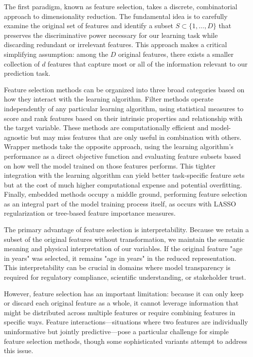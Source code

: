 The first paradigm, known as feature selection, takes a discrete, combinatorial approach to dimensionality reduction. The fundamental idea is to carefully examine the original set of features and identify a subset $S \subset \{1, \ldots, D\}$ that preserves the discriminative power necessary for our learning task while discarding redundant or irrelevant features. This approach makes a critical simplifying assumption: among the $D$ original features, there exists a smaller collection of $d$ features that capture most or all of the information relevant to our prediction task.

Feature selection methods can be organized into three broad categories based on how they interact with the learning algorithm. Filter methods operate independently of any particular learning algorithm, using statistical measures to score and rank features based on their intrinsic properties and relationship with the target variable. These methods are computationally efficient and model-agnostic but may miss features that are only useful in combination with others. Wrapper methods take the opposite approach, using the learning algorithm's performance as a direct objective function and evaluating feature subsets based on how well the model trained on those features performs. This tighter integration with the learning algorithm can yield better task-specific feature sets but at the cost of much higher computational expense and potential overfitting. Finally, embedded methods occupy a middle ground, performing feature selection as an integral part of the model training process itself, as occurs with LASSO regularization or tree-based feature importance measures.

The primary advantage of feature selection is interpretability. Because we retain a subset of the original features without transformation, we maintain the semantic meaning and physical interpretation of our variables. If the original feature "age in years" was selected, it remains "age in years" in the reduced representation. This interpretability can be crucial in domains where model transparency is required for regulatory compliance, scientific understanding, or stakeholder trust.

However, feature selection has an important limitation: because it can only keep or discard each original feature as a whole, it cannot leverage information that might be distributed across multiple features or require combining features in specific ways. Feature interactions—situations where two features are individually uninformative but jointly predictive—pose a particular challenge for simple feature selection methods, though some sophisticated variants attempt to address this issue.

